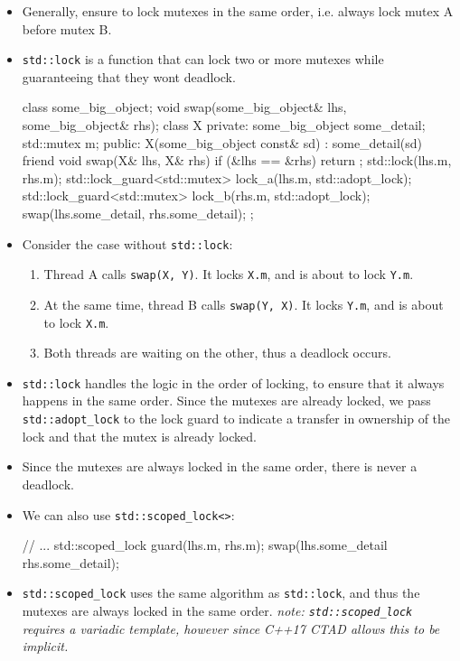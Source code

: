 \documentclass[11pt, a4paper]{article}
\theoremstyle{definition}
\theoremstyle{remark}
\newcommand{\code}[1]{\lstinline|#1|}
\begin{document}
\begin{itemize}
    \item Generally, ensure to lock mutexes in the same order, i.e. always lock mutex A before mutex B. 
    \item \code{std::lock} is a function that can lock two or more mutexes while guaranteeing that they wont deadlock. 
\begin{cppcode}
class some_big_object;
void swap(some_big_object& lhs, some_big_object& rhs);
class X {
private:
    some_big_object some_detail;
    std::mutex m;
public:
    X(some_big_object const& sd) : some_detail(sd) {}
    friend void swap(X& lhs, X& rhs) {
        if (&lhs == &rhs) return ;
        std::lock(lhs.m, rhs.m);
        std::lock_guard<std::mutex> lock_a(lhs.m, std::adopt_lock);
        std::lock_guard<std::mutex> lock_b(rhs.m, std::adopt_lock);
        swap(lhs.some_detail, rhs.some_detail);
    }
};
\end{cppcode}
    \item Consider the case without \code{std::lock}:
    \begin{enumerate}
        \item Thread A calls \code{swap(X, Y)}. It locks \code{X.m}, and is about to lock \code{Y.m}.
        \item At the same time, thread B calls \code{swap(Y, X)}. It locks \code{Y.m}, and is about to lock \code{X.m}. 
        \item Both threads are waiting on the other, thus a deadlock occurs.
    \end{enumerate}
    \item \code{std::lock} handles the logic in the order of locking, to ensure that it always happens in the same order. Since the mutexes are already locked, we pass \code{std::adopt_lock} to the lock guard to indicate a transfer in ownership of the lock and that the mutex is already locked. 
    \item Since the mutexes are always locked in the same order, there is never a deadlock.
    \item We can also use \code{std::scoped_lock<>}:
\begin{cppcode}
// ...
    std::scoped_lock guard(lhs.m, rhs.m);
    swap(lhs.some_detail rhs.some_detail);
\end{cppcode}
\item \code{std::scoped_lock} uses the same algorithm as \code{std::lock}, and thus the mutexes are always locked in the same order. \textit{note: \code{std::scoped_lock} requires a variadic template, however since C++17 CTAD allows this to be implicit.}

\end{itemize}
\end{document}
